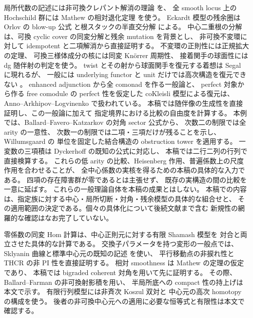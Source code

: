 局所代数の記述には非可換クレパント解消の理論
\cite{CMOIyamaWemyssMM,CMOIyamaWemyssCA}を、
全 smooth locus 上の Hochschild 群には Mathew の相対退化定理
\cite[Theorem~1.3]{CMOMathewDegeneration}を使う。
Eckardt 模型の残余圏は Orlov の blow-up 公式
\cite[Theorem~4.3]{CMOOrlovBlowup}と根スタックの半直交分解
\cite[Theorem~1.6]{CMOIshiiUedaRoot}による。
中心二重根の分解は、可換 cyclic cover の同変分解と残余 mutation
\cite[Sections~4 and~6]{CMOKuznetsovPerryCovers}を背景とし、
非可換不変環に対して idempotent と二項解消から直接証明する。
不変環の正則性には正規拡大の定理\cite{CMOZhouShenLu}、
可換三様体成分の核には同変 Kn\"orrer 周期性\cite{CMOHiranoKnorrer}、
接着関手の球面性には dg 随伴射の判定\cite{CMOAnnoLogvinenkoSpherical}を使う。
twist とその射から球面関手を復元する着想は
Segal \cite[Section~3.2]{CMOSegalSphericalTwists}に現れるが、
一般には underlying functor と unit だけでは高次構造を復元できない
\cite[Example~4.10]{CMOChristSphericalMonadic}。
enhanced adjunction から全 comonad を作る一般論と、
perfect 対象から作る free comodule の perfect 性を仮定した
coKleisli 模型による復元は、Anno--Arkhipov--Logvinenko
\cite[Theorems~6.1, 8.4]{CMOAnnoArkhipovLogvinenko}で扱われている。
本稿では随伴像の生成性を直接証明し、この一般論に加えて
指定境界における比較の自由度を計算する。
本例では、Ballard--Favero--Katzarkov
\cite[Theorem~5.39]{NFBFKKernels}の対角 sector 公式から、
次数二の制限では全 arity の一意性、
次数一の制限では二項・三項だけが残ることを示し、
Willumsgaard \cite[Theorem~3.3, Lemma~3.11]{CMOWillumsgaardAssociativity}の
単位を固定した結合構造の obstruction tower を適用する。
一変数の三項積は Dyckerhoff
\cite[Section~5.6, Theorem~5.8]{ROGDyckerhoff}の既知の公式に対応し、
本稿では二行二列の行列で直接検算する。
これらの低 arity の比較、Heisenberg 作用、普遍係数上の尺度作用を合わせることが、
全中心係数の実核を得るための本稿の具体的な入力である。
四項の存在障害群が零であるとは主張せず、
既存の実構造の間の比較を一意に延ばす。
これらの一般理論自体を本稿の成果とはしない。
本稿での内容は、指定族に対する中心・局所切断・対角・残余模型の具体的な組合せと、
その適用範囲の決定である。個々の具体化について後続文献まで含む
新規性の網羅的な確認はなお完了していない。

零係数の同変 Hom 計算は、中心正則元に対する有限 Shamash 模型を
対合と両立させた具体的な計算である。
交換子パラメータを持つ変形の一般点では、
Sklyanin 曲線と標準中心元の既知の記述
\cite[Sections~1--2]{GRSklyaninDLL}を使い、
平行移動点の非捩れ性と THCR の非 PI 性を直接証明する。
相対 smoothness は Mathew の定理の仮定であり、
本稿では bigraded coherent 対角を用いて先に証明する。
その際、Ballard--Farman
\cite[Theorem~4.15, Remark~4.17]{CMOBallardFarman}の非可換射影積を用い、
半局所底への compact 性の持上げは本文で示す。
有限行列模型には非斉次 Koszul 双対\cite{CMOPositselskiQL}と
中心元の高次 homotopy の構成\cite[Sections~3.4 and~4.3]{CMOEisenbudPeeva}を使う。
後者の非可換中心元への適用に必要な恒等式と有限性は本文で確認する。

